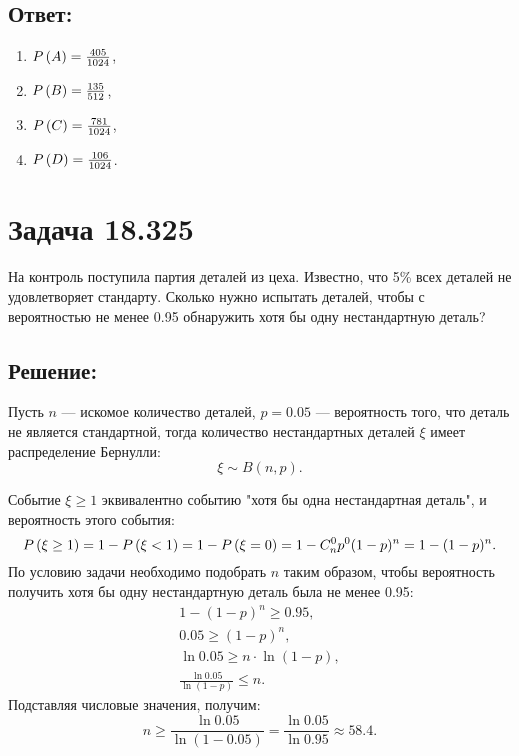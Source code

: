 \subsection*{Ответ:}
\begin{enumerate}
    \item $P \left ( A \right ) = \frac{405}{1024}$,
    \item $P \left ( B \right ) = \frac{135}{512}$,
    \item $P \left ( C \right ) = \frac{781}{1024}$,
    \item $P \left ( D \right ) = \frac{106}{1024}$.
\end{enumerate}

\section*{Задача 18.325}

На контроль поступила партия деталей из цеха. Известно, что 5\% всех деталей не удовлетворяет стандарту. Сколько нужно испытать деталей, чтобы с вероятностью не менее 0.95
обнаружить хотя бы одну нестандартную деталь?

\subsection*{Решение:}

Пусть $n$ --- искомое количество деталей, $p=0.05$ --- вероятность того, что деталь не является стандартной, тогда количество нестандартных деталей $\xi$ имеет распределение
Бернулли:
\begin{equation}
    \xi \sim B \left ( n, p \right ).
\end{equation}

Событие $\xi \ge 1$ эквивалентно событию "хотя бы одна нестандартная деталь", и вероятность этого события:
\begin{equation}
    P \left ( \xi \ge 1 \right )
    = 1 - P \left ( \xi < 1 \right )
    = 1 - P \left ( \xi = 0 \right )
    = 1 - C_n^0 p^0 (1 - p)^n
    = 1 - (1 - p)^n .
\end{equation}
По условию задачи необходимо подобрать $n$ таким образом, чтобы вероятность получить хотя бы одну нестандартную деталь была не менее 0.95:
\begin{gather}
    1 - (1 - p)^n \ge 0.95 , \\
    0.05 \ge (1 - p)^n , \\
    \ln 0.05 \ge n \cdot \ln (1 - p), \\
    \frac{\ln 0.05}{\ln (1-p)} \le n .
\end{gather}
Подставляя числовые значения,  получим:
\begin{equation}
    n
    \ge \frac{\ln 0.05}{\ln (1-0.05)}
    = \frac{\ln 0.05}{\ln 0.95}
    \approx 58.4 .
\end{equation}

